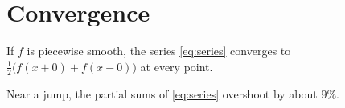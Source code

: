 \section{Convergence}\label{sec:convergence}
\begin{theorem}\label{thm:dirichlet}
  If $f$ is piecewise smooth, the series \eqref{eq:series} converges to
  $\frac12\bigl(f(x+0)+f(x-0)\bigr)$ at every point.
\end{theorem}
Near a jump, the partial sums of \eqref{eq:series} overshoot by about 9\%.
